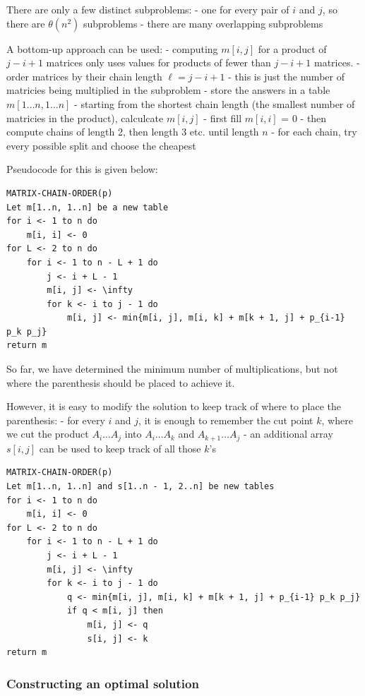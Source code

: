 \documentclass[11pt]{article}
\begin{document}
There are only a few distinct subproblems: - one for every pair of \(i\)
and \(j\), so there are \(\theta(n^2)\) subproblems - there are many
overlapping subproblems

A bottom-up approach can be used: - computing \(m[i, j]\) for a product
of \(j - i + 1\) matrices only uses values for products of fewer than
\(j - i + 1\) matrices. - order matrices by their chain length
\(\ell = j - i + 1\) - this is just the number of matricies being
multiplied in the subproblem - store the answers in a table
\(m[1 \ldots n, 1 \ldots n]\) - starting from the shortest chain length
(the smallest number of matricies in the product), calculcate \(m[i,j]\)
- first fill \(m[i,i]\) = 0 - then compute chains of length 2, then
length 3 etc. until length \(n\) - for each chain, try every possible
split and choose the cheapest

Pseudocode for this is given below:

\begin{verbatim}
MATRIX-CHAIN-ORDER(p)
Let m[1..n, 1..n] be a new table
for i <- 1 to n do
    m[i, i] <- 0
for L <- 2 to n do
    for i <- 1 to n - L + 1 do
        j <- i + L - 1
        m[i, j] <- \infty
        for k <- i to j - 1 do
            m[i, j] <- min{m[i, j], m[i, k] + m[k + 1, j] + p_{i-1} p_k p_j}
return m
\end{verbatim}

So far, we have determined the minimum number of multiplications, but
not where the parenthesis should be placed to achieve it.

However, it is easy to modify the solution to keep track of where to
place the parenthesis: - for every \(i\) and \(j\), it is enough to
remember the cut point \(k\), where we cut the product
\(A_i \ldots A_j\) into \(A_i \ldots A_k\) and \(A_{k+1} \ldots A_j\) -
an additional array \(s[i, j]\) can be used to keep track of all those
\(k\)'s

\begin{verbatim}
MATRIX-CHAIN-ORDER(p)
Let m[1..n, 1..n] and s[1..n - 1, 2..n] be new tables
for i <- 1 to n do
    m[i, i] <- 0
for L <- 2 to n do
    for i <- 1 to n - L + 1 do
        j <- i + L - 1
        m[i, j] <- \infty
        for k <- i to j - 1 do
            q <- min{m[i, j], m[i, k] + m[k + 1, j] + p_{i-1} p_k p_j}
            if q < m[i, j] then
                m[i, j] <- q
                s[i, j] <- k
return m
\end{verbatim}

    \subsubsection{Constructing an optimal
solution}\label{constructing-an-optimal-solution}
\end{document}

